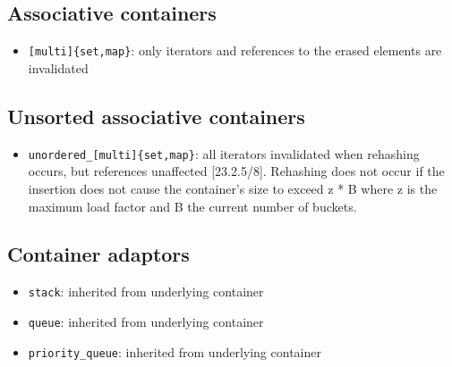 \documentclass[UTF8,a4paper,12pt]{ctexbook}
\begin{document}
		\subsection{Associative containers}
			\begin{itemize}
				\item \verb|[multi]{set,map}|:  only iterators and references to the erased elements are invalidated 
			\end{itemize}
		\subsection{Unsorted associative containers}
			\begin{itemize}
				\item \verb|unordered_[multi]{set,map}|: all iterators invalidated when rehashing occurs, but references unaffected [23.2.5/8]. Rehashing does not occur if the insertion does not cause the container's size to exceed z * B where z is the maximum load factor and B the current number of buckets.
			\end{itemize}
		
		\subsection{Container adaptors}
			\begin{itemize}
				\item \verb|stack|: inherited from underlying container
				\item \verb|queue|: inherited from underlying container
				\item \verb|priority_queue|: inherited from underlying container
			\end{itemize}
\end{document}
